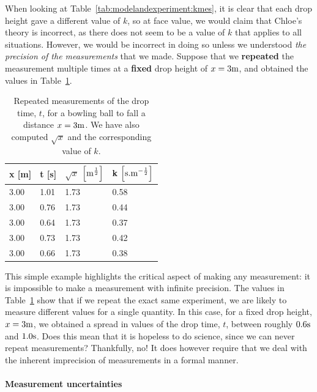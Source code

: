 When looking at Table~\ref{tab:modelandexperiment:kmes}, it is clear that each drop height gave a different value of $k$, so at face value, we would claim that Chloe's theory is incorrect, as there does not seem to be a value of $k$ that applies to all situations. However, we would be incorrect in doing so unless we understood \textit{the precision of the measurements} that we made. Suppose that we \textbf{repeated} the measurement multiple times at a \textbf{fixed} drop height of $x=3 {\rm m}$, and obtained the values in Table~\ref{tab:modelandexperiment:kmes_3m}.

\begin{table}
\centering
\caption[]{Repeated measurements of the drop time, $t$, for a bowling ball to fall a distance $x=3 {\rm m}$. We have also computed $\sqrt x$ and the corresponding value of $k$.}
\label{tab:modelandexperiment:kmes_3m}
\begin{tabular}{p{}p{}p{}p{}}
\toprule
\textbf{x} [m] & \textbf{t} [s] & \textbf{$\sqrt x$}  ${\rm \left[{m^{\frac{1}{2}}}\right]}$ & \textbf{k}  ${\rm \left[{s.m^{ -\frac{1}{2}}}\right]}$ \\
\hline
3.00 & 1.01 & 1.73 & 0.58 \\
3.00 & 0.76 & 1.73 & 0.44 \\
3.00 & 0.64 & 1.73 & 0.37 \\
3.00 & 0.73 & 1.73 & 0.42 \\
3.00 & 0.66 & 1.73 & 0.38 \\
\bottomrule
\end{tabular}
\end{table}

This simple example highlights the critical aspect of making any measurement: it is impossible to make a measurement with infinite precision. The values in Table~\ref{tab:modelandexperiment:kmes_3m} show that if we repeat the exact same experiment, we are likely to measure different values for a single quantity. In this case, for a fixed drop height, $x=3 {\rm m}$, we obtained a spread in values of the drop time, $t$, between roughly $0.6 {\rm s}$ and $1.0 {\rm s}$. Does this mean that it is hopeless to do science, since we can never repeat measurements? Thankfully, no! It does however require that we deal with the inherent imprecision of measurements in a formal manner.

\paragraph{Measurement uncertainties}\label{sec:ModelAndExperiment:uncertainties}

